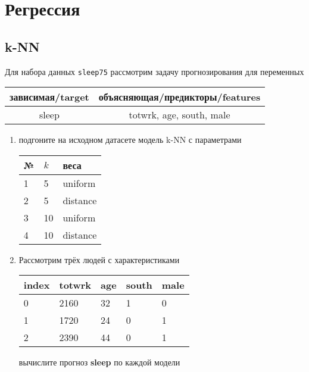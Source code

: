 
\section{Регрессия}

\subsection{k-NN}

\begin{exercise}
Для набора данных \texttt{sleep75} рассмотрим задачу прогнозирования
для переменных
\begin{center}
	\begin{tabular}{|c|c|}\hline
		зависимая/target & объясняющая/предикторы/features \\ \hline
		sleep & totwrk, age, south, male \\ \hline
	\end{tabular}
\end{center}
\begin{enumerate}
	\item подгоните на исходном датасете модель k-NN с параметрами
	\begin{center}
		\begin{tabular}{|l|l|l|}\hline
		№ & \(k\) & веса \\ \hline
		1 & 5 & uniform \\
		2 & 5 & distance \\
		3 & 10 & uniform \\
		4 & 10 & distance \\ \hline
		\end{tabular}
	\end{center}
	\item Рассмотрим трёх людей с характеристиками
	\begin{center}
		\begin{tabular}{|l||l|l|l|l|}\hline
			index & totwrk & age & south & male \\ \hline\hline
			0 & 2160 & 32 & 1 & 0 \\
			1 & 1720 & 24 & 0 & 1 \\
			2 & 2390 & 44 & 0 & 1 \\ \hline
		\end{tabular}
	\end{center}
	вычислите прогноз \textbf{sleep} по каждой модели
\end{enumerate}
\end{exercise}

